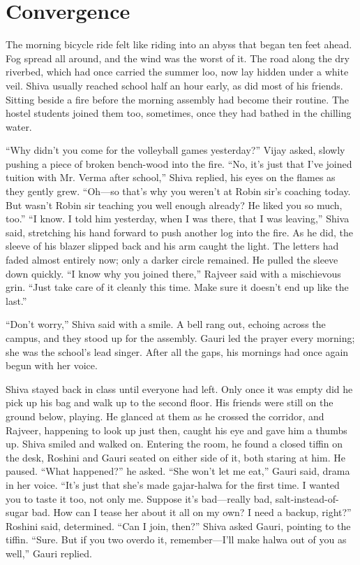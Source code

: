 \chapter{Convergence}

The morning bicycle ride felt like riding into an abyss that began ten feet ahead. Fog spread all around, and the wind was the worst of it. The road along the dry riverbed, which had once carried the summer loo, now lay hidden under a white veil. Shiva usually reached school half an hour early, as did most of his friends. Sitting beside a fire before the morning assembly had become their routine. The hostel students joined them too, sometimes, once they had bathed in the chilling water.

``Why didn't you come for the volleyball games yesterday?'' Vijay asked, slowly pushing a piece of broken bench-wood into the fire.
``No, it's just that I've joined tuition with Mr. Verma after school,'' Shiva replied, his eyes on the flames as they gently grew.
``Oh—so that's why you weren't at Robin sir's coaching today. But wasn't Robin sir teaching you well enough already? He liked you so much, too.''
``I know. I told him yesterday, when I was there, that I was leaving,'' Shiva said, stretching his hand forward to push another log into the fire. As he did, the sleeve of his blazer slipped back and his arm caught the light. The letters had faded almost entirely now; only a darker circle remained. He pulled the sleeve down quickly.
``I know why you joined there,'' Rajveer said with a mischievous grin. ``Just take care of it cleanly this time. Make sure it doesn't end up like the last.''

``Don't worry,'' Shiva said with a smile. A bell rang out, echoing across the campus, and they stood up for the assembly. Gauri led the prayer every morning; she was the school's lead singer. After all the gaps, his mornings had once again begun with her voice.

Shiva stayed back in class until everyone had left. Only once it was empty did he pick up his bag and walk up to the second floor. His friends were still on the ground below, playing. He glanced at them as he crossed the corridor, and Rajveer, happening to look up just then, caught his eye and gave him a thumbs up. Shiva smiled and walked on. Entering the room, he found a closed tiffin on the desk, Roshini and Gauri seated on either side of it, both staring at him. He paused. ``What happened?'' he asked.
``She won't let me eat,'' Gauri said, drama in her voice.
``It's just that she's made gajar-halwa for the first time. I wanted you to taste it too, not only me. Suppose it's bad—really bad, salt-instead-of-sugar bad. How can I tease her about it all on my own? I need a backup, right?'' Roshini said, determined.
``Can I join, then?'' Shiva asked Gauri, pointing to the tiffin.
``Sure. But if you two overdo it, remember—I'll make halwa out of you as well,'' Gauri replied.

